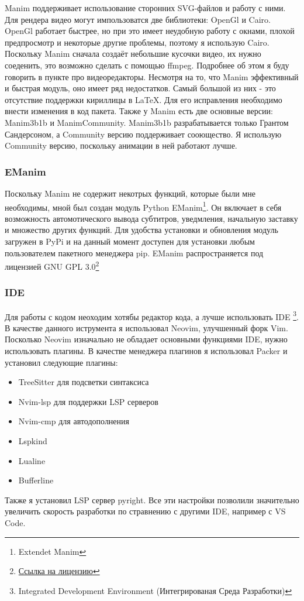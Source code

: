 \documentclass[a4paper, 14pt]{extarticle}
\begin{document}
Manim поддерживает использование сторонних SVG-файлов и работу с ними.
Для рендера видео могут импользоватся две библиотеки: OpenGl и Cairo.
OpenGl работает быстрее, но при это имеет неудобную работу с окнами,
плохой предпросмотр и некоторые другие проблемы, поэтому я использую Cairo.
Поскольку Manim сначала создаёт небольшие кусочки видео, их нужно соеденить,
это возможно сделать с помощью ffmpeg. Подробнее об этом я буду говорить
в пункте про видеоредакторы.
Несмотря на то, что Manim эффективный и быстрая модуль, оно имеет ряд
недостатков. Самый большой из них - это отсутствие поддержки кириллицы
в \LaTeX. Для его исправления необходимо внести изменения в код пакета.
Также у Manim есть две основные версии: Manim3b1b и ManimCommunity.
Manim3b1b разрабатывается только Грантом Сандерсоном, а Community версию
поддерживает сооющество. Я использую Community версию, поскольку
анимации в ней работают лучше.

\subsubsection{EManim}
Поскольку Manim не содержит некотрых функций, которые были мне необходимы,
мной был создан модуль Python EManim\footnote{Extendet Manim}.
Он включает в себя возможность автомотического вывода субтитров, уведмления,
начальную заставку и множество других функций. Для удобства установки
и обновления модуль загружен в PyPi и на данный момент доступен
для установки любым пользователем пакетного менеджера pip.
EManim распространяется под лицензией GNU GPL 3.0\footnote{
    \href{https://www.gnu.org/licenses/gpl-3.0.en.html}{Ссылка на лицензию}
}

\subsubsection{IDE}
Для работы с кодом неоходим хотябы редактор кода, а лучше использовать IDE
\footnote{
    Integrated Development Environment (Интегрированая Среда Разработки)
}.
В качестве данного иструмента я использовал Neovim, улучшенный форк Vim.
Посколько Neovim изначально не обладает основными функциями IDE,
нужно использовать плагины. В качестве менеджера плагинов я использовал
Packer и установил следующие плагины:
\begin{itemize}
    \item TreeSitter для подсветки синтаксиса
    \item Nvim-lsp для поддержки LSP серверов
    \item Nvim-cmp для автодополнения
    \item Lspkind
    \item Lualine
    \item Bufferline
\end{itemize}
Также я установил LSP сервер pyright. Все эти настройки позволили
значительно увеличить скорость разработки по стравнению с другими IDE,
например с VS Code.
\end{document}
